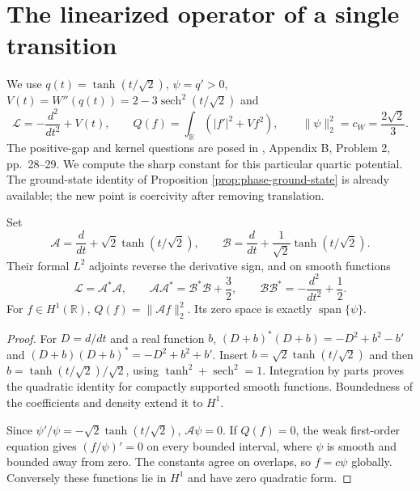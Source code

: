 \chapter{The linearized operator of a single transition}\label{sec:phase-linearized-transition}
We use $q(t)=\tanh(t/\sqrt2)$, $\psi=q'>0$, $V(t)=W''(q(t))=2-3\operatorname{sech}^2(t/\sqrt2)$ and
\[
 \mathscr L=-\frac{d^2}{dt^2}+V(t),\qquad
 Q(f)=\int_{\mathbb R}(|f'|^2+Vf^2),\qquad
 \|\psi\|_2^2=c_W=\frac{2\sqrt2}{3}.
\]
The positive-gap and kernel questions are posed in \cite{ChAC}, Appendix B, Problem 2, pp.~28--29. We compute the sharp constant for this particular quartic potential. The ground-state identity of Proposition \ref{prop:phase-ground-state} is already available; the new point is coercivity after removing translation.

\begin{lemma}\label{lem:phase-two-factorizations}
Set
\[
 \mathcal A=\frac d{dt}+\sqrt2\tanh(t/\sqrt2),\qquad
 \mathcal B=\frac d{dt}+\frac1{\sqrt2}\tanh(t/\sqrt2).
\]
Their formal $L^2$ adjoints reverse the derivative sign, and on smooth functions
\[
 \mathscr L=\mathcal A^*\mathcal A,\qquad
 \mathcal A\mathcal A^*=\mathcal B^*\mathcal B+\frac32,
 \qquad \mathcal B\mathcal B^*=-\frac{d^2}{dt^2}+\frac12.
\]
For $f\in H^1(\mathbb R)$, $Q(f)=\|\mathcal A f\|_2^2$. Its zero space is exactly $\operatorname{span}\{\psi\}$.
\end{lemma}
\begin{proof}
For $D=d/dt$ and a real function $b$, $(D+b)^*(D+b)=-D^2+b^2-b'$ and $(D+b)(D+b)^*=-D^2+b^2+b'$. Insert $b=\sqrt2\tanh(t/\sqrt2)$ and then $b=\tanh(t/\sqrt2)/\sqrt2$, using $\tanh^2+\operatorname{sech}^2=1$. Integration by parts proves the quadratic identity for compactly supported smooth functions. Boundedness of the coefficients and density extend it to $H^1$.

Since $\psi'/\psi=-\sqrt2\tanh(t/\sqrt2)$, $\mathcal A\psi=0$. If $Q(f)=0$, the weak first-order equation gives $(f/\psi)'=0$ on every bounded interval, where $\psi$ is smooth and bounded away from zero. The constants agree on overlaps, so $f=c\psi$ globally. Conversely these functions lie in $H^1$ and have zero quadratic form.
\end{proof}

